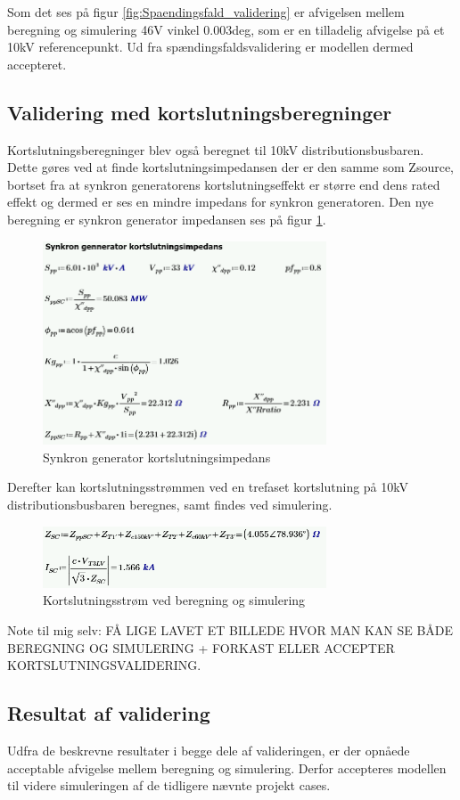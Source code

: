  Som det ses på figur \ref{fig:Spaendingsfald_validering} er afvigelsen mellem beregning og simulering 46V vinkel 0.003deg, som er en tilladelig afvigelse på et 10kV referencepunkt. Ud fra spændingsfaldsvalidering er modellen dermed accepteret.
 
\subsection{Validering med kortslutningsberegninger}
Kortslutningsberegninger blev også beregnet til 10kV distributionsbusbaren. Dette gøres ved at finde kortslutningsimpedansen der er den samme som Zsource, bortset fra at synkron generatorens kortslutningseffekt er større end dens rated effekt og dermed er ses en mindre impedans for synkron generatoren. Den nye beregning er synkron generator impedansen ses på figur \ref{fig:SGimpedansSC}.

\begin{figure}[H] %
	\centering
	\includegraphics[width=0.75\textwidth]{figurer/Synkron_generator_valideringSC}
	\caption{Synkron generator kortslutningsimpedans}
	\label{fig:SGimpedansSC}
\end{figure}

Derefter kan kortslutningsstrømmen ved en trefaset kortslutning på 10kV distributionsbusbaren beregnes, samt findes ved simulering.

\begin{figure}[H] %
	\centering
	\includegraphics[width=0.75\textwidth]{figurer/Kortslutningsstroem_validering}
	\caption{Kortslutningsstrøm ved beregning og simulering}
	\label{fig:SCvalidering}
\end{figure}

Note til mig selv: FÅ LIGE LAVET ET BILLEDE HVOR MAN KAN SE BÅDE BEREGNING OG SIMULERING + FORKAST ELLER ACCEPTER KORTSLUTNINGSVALIDERING.


\subsection{Resultat af validering}

Udfra de beskrevne resultater i begge dele af valideringen, er der opnåede acceptable afvigelse mellem beregning og simulering. Derfor accepteres modellen til videre simuleringen af de tidligere nævnte projekt cases.